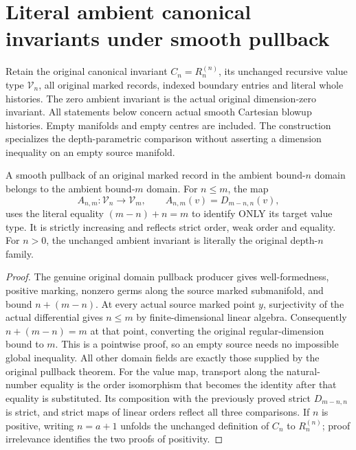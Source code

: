 \section{Literal ambient canonical invariants under smooth pullback}

Retain the original canonical invariant $C_n=R^{(n)}_n$, its unchanged
recursive value type $\mathcal V_n$, all original marked records, indexed
boundary entries and literal whole histories. The zero ambient invariant is
the actual original dimension-zero invariant. All statements below concern
actual smooth Cartesian blowup histories. Empty manifolds and empty centres
are included. The construction specializes the depth-parametric comparison
without asserting a dimension inequality on an empty source manifold.

\begin{lemma}
\label{hir:smooth-original-ambient-domain-value-specialization}
\leanok
{}
A smooth pullback of an original marked record in the ambient bound-$n$
domain belongs to the ambient bound-$m$ domain. For $n\leq m$, the map
\[
 A_{n,m}:\mathcal V_n\longrightarrow\mathcal V_m,
 \qquad A_{n,m}(v)=D_{m-n,n}(v),
\]
uses the literal equality $(m-n)+n=m$ to identify ONLY its target value
type. It is strictly increasing and reflects strict order, weak order and
equality. For $n>0$, the unchanged ambient invariant is literally the
original depth-$n$ family.
\end{lemma}
\begin{proof}
The genuine original domain pullback producer gives well-formedness,
positive marking, nonzero germs along the source marked submanifold, and
bound $n+(m-n)$. At every actual source marked point $y$, surjectivity of
the actual differential gives $n\leq m$ by finite-dimensional linear
algebra. Consequently $n+(m-n)=m$ at that point, converting the original
regular-dimension bound to $m$. This is a pointwise proof, so an empty
source needs no impossible global inequality. All other domain fields are
exactly those supplied by the original pullback theorem. For the value map,
transport along the natural-number equality is the order isomorphism that
becomes the identity after that equality is substituted. Its composition
with the previously proved strict $D_{m-n,n}$ is strict, and strict maps of
linear orders reflect all three comparisons. If $n$ is positive, writing
$n=a+1$ unfolds the unchanged definition of $C_n$ to $R^{(n)}_n$;
proof irrelevance identifies the two proofs of positivity.
\end{proof}

